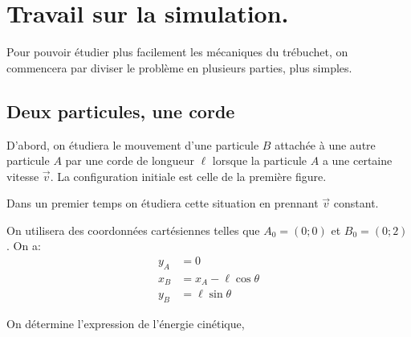 \documentclass[10pt]{article}
\begin{document}
\pagebreak

\section{Travail sur la simulation.}
Pour pouvoir étudier plus facilement les mécaniques du trébuchet, on commencera par diviser le problème en plusieurs parties, plus simples.

\subsection{Deux particules, une corde}

D'abord, on étudiera le mouvement d'une particule $B$ attachée à une autre particule $A$ par une corde de longueur $\ell$ lorsque la particule $A$ a une certaine vitesse $\vec{v}$. La configuration initiale est celle de la première figure.


\begin{figure}[!h]
\centering
{}
\hspace{2cm}
\end{figure}
Dans un premier temps on étudiera cette situation en prennant $\vec{v}$ constant.

On utilisera des coordonnées cartésiennes telles que $A_0 = (0;0)$ et $B_0 = (0;2)$. On a:
\begin{align*}
y_A &= 0 \\
x_B &= x_A - \ell\cos{\theta}\\
y_B &= \ell\sin{\theta}
\end{align*}

On détermine l'expression de l'énergie cinétique,
\end{document}
